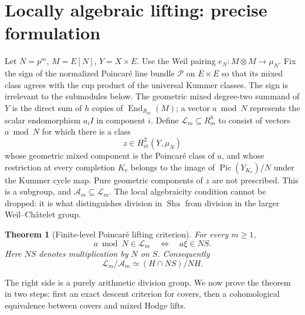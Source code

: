 \documentclass[11pt,a4paper]{article}
\newtheorem{theorem}{Theorem}[section]\newtheorem{lemma}[theorem]{Lemma}\newtheorem{corollary}[theorem]{Corollary}\newtheorem{proposition}[theorem]{Proposition}
\theoremstyle{remark}\newtheorem{remark}[theorem]{Remark}
\newcommand{\Sha}{\mathop{\mathrm{Sha}}}\newcommand{\Pic}{\operatorname{Pic}}\newcommand{\Br}{\operatorname{Br}}\newcommand{\NS}{\operatorname{NS}}\newcommand{\Gal}{\operatorname{Gal}}\newcommand{\Hom}{\operatorname{Hom}}\newcommand{\Z}{\mathbb Z}\newcommand{\Q}{\mathbb Q}\newcommand{\F}{\mathbb F}\newcommand{\G}{\mathbb G}\newcommand{\coker}{\operatorname{coker}}\newcommand{\loc}{\operatorname{loc}}\newcommand{\et}{\mathrm{\acute et}}\newcommand{\Div}{\operatorname{Div}}\newcommand{\ord}{\operatorname{ord}}\newcommand{\im}{\operatorname{im}}\newcommand{\diag}{\operatorname{diag}}\newcommand{\rank}{\operatorname{rank}}\newcommand{\Sel}{\operatorname{Sel}}
\begin{document}
\section{Locally algebraic lifting: precise formulation}
Let $N=p^m$, $M=E[N]$, $Y=X\times E$. Use the Weil pairing $e_N:M\otimes M\to\mu_N$. Fix the sign of the normalized Poincar\'e line bundle $\mathcal P$ on $E\times E$ so that its mixed class agrees with the cup product of the universal Kummer classes. The sign is irrelevant to the submodules below. The geometric mixed degree-two summand of $Y$ is the direct sum of $h$ copies of $\operatorname{End}_{R_m}(M)$; a vector $a\bmod N$ represents the scalar endomorphism $a_i I$ in component $i$.
Define $\mathcal L_m\subseteq R_m^h$ to consist of vectors $a\bmod N$ for which there is a class
\[
 z\in H^2_{\et}(Y,\mu_N)
\]
whose geometric mixed component is the Poincar\'e class of $a$, and whose restriction at every completion $K_v$ belongs to the image of $\Pic(Y_{K_v})/N$ under the Kummer cycle map. Pure geometric components of $z$ are not prescribed. This is a subgroup, and $\mathcal A_m\subseteq\mathcal L_m$. The local algebraicity condition cannot be dropped: it is what distinguishes division in $\Sha$ from division in the larger Weil--Ch\^atelet group.

\begin{theorem}[Finite-level Poincar\'e lifting criterion]\label{lift}
For every $m\ge1$,
\begin{equation}\label{criterion}
 a\bmod N\in\mathcal L_m\quad\Longleftrightarrow\quad a\xi\in N S.
\end{equation}
Here $N S$ denotes multiplication by $N$ on $S$. Consequently
\begin{equation}\label{quot}
 \mathcal L_m/\mathcal A_m\simeq (H\cap N S)/NH.
\end{equation}
\end{theorem}
The right side is a purely arithmetic division group. We now prove the theorem in two steps: first an exact descent criterion for covers, then a cohomological equivalence between covers and mixed Hodge lifts.
\end{document}

